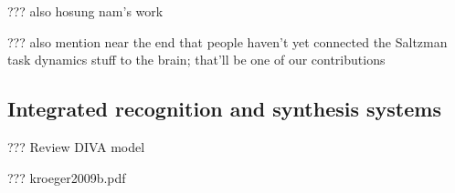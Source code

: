 ??? also hosung nam's work

??? also mention near the end that people haven't
yet connected the Saltzman task dynamics stuff
to the brain; that'll be one of our contributions

\subsection{Integrated recognition and synthesis systems}

??? Review DIVA model

??? kroeger2009b.pdf


